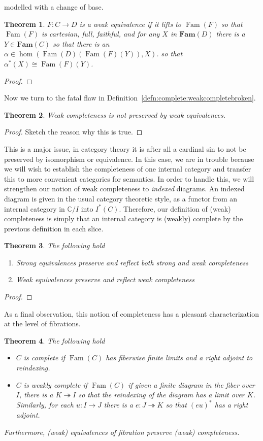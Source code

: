 \documentclass[12pt]{amsart}
\newcommand{\todo}[1]{{\color{red}{\LARGE #1}}}
\newcommand{\cat}[1]{\ensuremath{\mathbf{#1}}}
\newcommand{\Ccat}{\ensuremath{\mathbb{C}}}
\newcommand{\epi}{\ensuremath{\twoheadrightarrow}}
\DeclareMathOperator{\family}{Fam}
\newtheorem{thm}{Theorem}[section]
\begin{document}
modelled with a change of base. \todo{elaborate}
\begin{thm}\label{thm:complete:weakequivalencelifts}
  $F : C \to D$ is a weak equivalence if it lifts to $\family(F)$ so
  that $\family(F)$ is cartesian, full, faithful, and for any $X$ in
  $\cat{Fam}(D)$ there is a $Y \in \cat{Fam}(C)$ so that
  there is an $\alpha \in \hom(\family(D)(\family(F)(Y)), X)$. so that
  $\alpha^*(X) \cong \family(F)(Y)$.
\end{thm}
\begin{proof}
  \todo{This is weird but not too bad}
\end{proof}
Now we turn to the fatal flaw in
Definition~\ref{defn:complete:weakcompletebroken}.
\begin{thm}\label{thm:complete:weakcompletenotpreserved}
  Weak completeness is not preserved by weak equivalences.
\end{thm}
\begin{proof}
  Sketch the reason why this is true.
\end{proof}
This is a major issue, in category theory it is after all a cardinal
sin to not be preserved by isomorphism or equivalence. In this case,
we are in trouble because we will wish to establish the completeness
of one internal category and transfer this to more convenient
categories for semantics. In order to handle this, we will strengthen
our notion of weak completeness to \emph{indexed} diagrams. An indexed
diagram is given in the usual category theoretic style, as a functor
from an internal category in $\Ccat/I$ into $I^*(C)$. Therefore, our
definition of (weak) completeness is simply that an internal category
is (weakly) complete by the previous definition in each slice.
\begin{thm}\label{thm:complete:preservation}
  The following hold
  \begin{enumerate}
  \item Strong equivalences preserve and reflect both strong and weak
    completeness
  \item Weak equivalences preserve and reflect weak completeness
  \end{enumerate}
\end{thm}
\begin{proof}
  \todo{This is tricky but important}
\end{proof}
As a final observation, this notion of completeness has a pleasant
characterization at the level of fibrations.
\begin{thm}\label{thm:complete:completefibration}
  The following hold
  \begin{itemize}
  \item $C$ is complete if $\family(C)$ has fiberwise finite limits and a
    right adjoint to reindexing.
  \item $C$ is weakly complete if $\family(C)$ if given a finite
    diagram in the fiber over $I$, there is a $K \epi I$ so that the
    reindexing of the diagram has a limit over $K$. Similarly, for
    each $u : I \to J$ there is a $e : J \epi K$ so that $(eu)^*$ has
    a right adjoint.
  \end{itemize}
  Furthermore, (weak) equivalences of fibration preserve (weak)
  completeness.
\end{thm}
\end{document}
